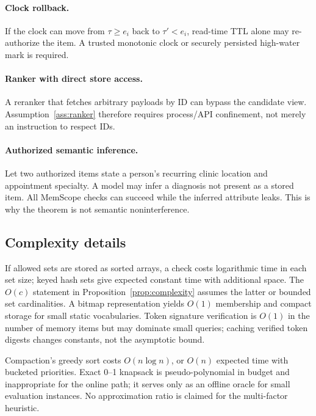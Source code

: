 \paragraph{Clock rollback.}
If the clock can move from $\tau\ge e_i$ back to $\tau'<e_i$, read-time TTL alone may re-authorize the item. A trusted monotonic clock or securely persisted high-water mark is required.

\paragraph{Ranker with direct store access.}
A reranker that fetches arbitrary payloads by ID can bypass the candidate view. Assumption~\ref{ass:ranker} therefore requires process/API confinement, not merely an instruction to respect IDs.

\paragraph{Authorized semantic inference.}
Let two authorized items state a person's recurring clinic location and appointment specialty. A model may infer a diagnosis not present as a stored item. All MemScope checks can succeed while the inferred attribute leaks. This is why the theorem is not semantic noninterference.

\subsection{Complexity details}

If allowed sets are stored as sorted arrays, a check costs logarithmic time in each set size; keyed hash sets give expected constant time with additional space. The $O(c)$ statement in Proposition~\ref{prop:complexity} assumes the latter or bounded set cardinalities. A bitmap representation yields $O(1)$ membership and compact storage for small static vocabularies. Token signature verification is $O(1)$ in the number of memory items but may dominate small queries; caching verified token digests changes constants, not the asymptotic bound.

Compaction's greedy sort costs $O(n\log n)$, or $O(n)$ expected time with bucketed priorities. Exact 0--1 knapsack is pseudo-polynomial in budget and inappropriate for the online path; it serves only as an offline oracle for small evaluation instances. No approximation ratio is claimed for the multi-factor heuristic.
